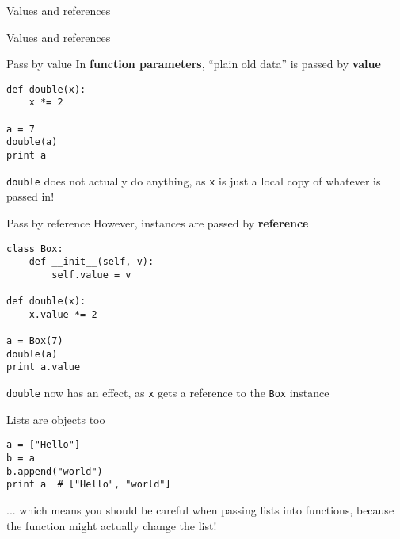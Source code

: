 \begin{frame}{Values and references}
	\socrative
\end{frame}

\begin{frame}{Values and references}
	\socrative
\end{frame}

\begin{frame}[fragile]{Pass by value}
	\pause
	In \textbf{function parameters},
	``plain old data'' is passed by \textbf{value}
	\pause
	\begin{lstlisting}
def double(x):
    x *= 2

a = 7
double(a)
print a
	\end{lstlisting}
	\pause
	\lstinline{double} does not actually do anything, as \lstinline{x} is just a local copy of
		whatever is passed in!
\end{frame}

\begin{frame}[fragile]{Pass by reference}
	\pause
	However, instances are passed by \textbf{reference}
	\begin{lstlisting}
class Box:
    def __init__(self, v):
        self.value = v

def double(x):
    x.value *= 2

a = Box(7)
double(a)
print a.value
	\end{lstlisting}
	\pause
	\lstinline{double} now has an effect, as \lstinline{x} gets a reference to the \lstinline{Box} instance
\end{frame}

\begin{frame}[fragile]{Lists are objects too}
	\pause
	\begin{lstlisting}
a = ["Hello"]
b = a
b.append("world")
print a  # ["Hello", "world"]
	\end{lstlisting}
	\pause
	... which means you should be careful when passing lists into functions,
	because the function might actually change the list!
\end{frame}


